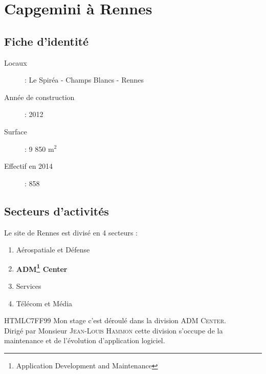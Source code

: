 \chapter{Capgemini à Rennes}
\section{Fiche d'identité}
\begin{description}
  \item[Locaux] : Le Spiréa - Champs Blancs - Rennes
  \item[Année de construction] : 2012
  \item[Surface] : 9 850 m$^2$
  \item[Effectif en 2014] : 858
\end{description}
\begin{figure}[h]
\end{figure}
\newpage
\section{Secteurs d'activités}
Le site de Rennes est divisé en 4 secteurs :
\begin{enumerate}
\item Aérospatiale et Défense
\item \textbf{ADM\footnote{Application Development and Maintenance} Center}
\item Services
\item Télécom et Média\\
\end{enumerate}

\begin{colbox}{{HTML}{C7FF99}}{}
  Mon stage c'est déroulé dans la division \textsc{ADM Center}.\\
  Dirigé par Monsieur \textsc{Jean-Louis Hammon}
  cette division s'occupe de la maintenance et de l'évolution d'application logiciel.
\end{colbox}

